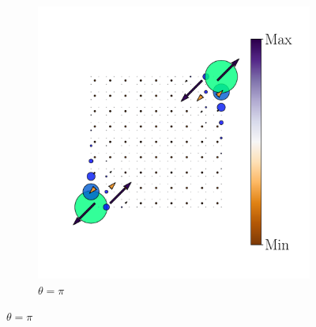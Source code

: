 \begin{figure}[h!]
\begin{minipage}[h!]{1.1\textwidth}
\begin{subfigure}[b!]{0.2 \textwidth}
         \end{subfigure}\hspace*{-0.5em}
          \begin{subfigure}[b!]{0.2 \textwidth}
             \caption*{$\theta = \pi$}
             \includegraphics[width=\textwidth]{Imagenes/Resultados_pump_Cuadrado/x/hoti_pomp_x_pos5.pdf}
         \end{subfigure}\hspace*{-0.5em}
     \end{minipage}\vspace*{-1em}
     

\end{figure}
